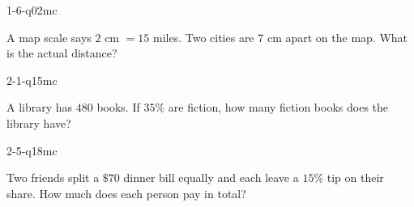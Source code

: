 \begin{practiceQuestion}{1-6-q02}{mc}
\begin{questionText}
A map scale says $2$ cm $= 15$ miles. Two cities are $7$ cm apart on the map. What is the actual distance?
\end{questionText}
\end{practiceQuestion}

\begin{practiceQuestion}{2-1-q15}{mc}
\begin{questionText}
A library has $480$ books. If $35\%$ are fiction, how many fiction books does the library have?
\end{questionText}
\end{practiceQuestion}

\begin{practiceQuestion}{2-5-q18}{mc}
\begin{questionText}
Two friends split a $\$70$ dinner bill equally and each leave a $15\%$ tip on their share. How much does each person pay in total?
\end{questionText}
\end{practiceQuestion}


